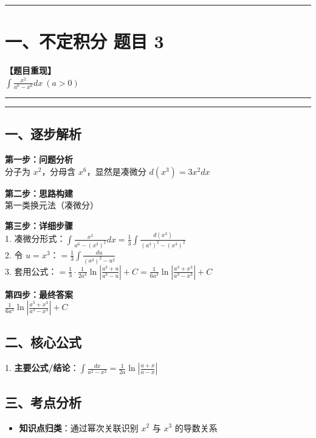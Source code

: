 ﻿\documentclass[12pt, a4paper]{ctexart}
\newcommand{\TopSeparator}{
    \par\noindent\rule{\textwidth}{1.5pt}\vspace{0.5em}
}
\newcommand{\AnalysisSeparator}{
    \par\noindent\rule{\textwidth}{0.5pt}\vspace{0.2em}\hrule\vspace{0.5em}
}
\newenvironment{RedAnalysis}{
    \par
    \color{red} 
}{
    \par
    \color{black} 
}
\begin{document}
\vspace{2em}

\TopSeparator
\section*{一、不定积分 题目 3}

\textbf{【题目重现】} \\
$\int \frac{x^2}{a^6 - x^6} dx \ (a>0)$

\AnalysisSeparator

\begin{RedAnalysis}

	\subsection*{一、逐步解析}

	\textbf{第一步：问题分析} \\
	分子为 $x^2$，分母含 $x^6$，显然是凑微分 $d(x^3) = 3x^2 dx$

	\textbf{第二步：思路构建} \\
	第一类换元法（凑微分）

	\textbf{第三步：详细步骤} \\
	1. 凑微分形式：$\int \frac{x^2}{a^6 - (x^3)^2} dx = \frac{1}{3} \int \frac{d(x^3)}{(a^3)^2 - (x^3)^2}$ \\ 
	2. 令 $u=x^3$：$= \frac{1}{3} \int \frac{du}{(a^3)^2 - u^2}$ \\ 
	3. 套用公式：$= \frac{1}{3} \cdot \frac{1}{2a^3} \ln \left| \frac{a^3+u}{a^3-u} \right| + C = \frac{1}{6a^3} \ln \left| \frac{a^3+x^3}{a^3-x^3} \right| + C$

	\textbf{第四步：最终答案} \\
	$\frac{1}{6a^3} \ln \left| \frac{a^3+x^3}{a^3-x^3} \right| + C$

	\subsection*{二、核心公式}
	1. \textbf{主要公式/结论}：$\int \frac{dx}{a^2-x^2} = \frac{1}{2a} \ln \left| \frac{a+x}{a-x} \right|$

	\subsection*{三、考点分析}
	\begin{itemize}
		\item \textbf{知识点归类}：通过幂次关联识别 $x^2$ 与 $x^3$ 的导数关系
	\end{itemize}

\end{RedAnalysis}
\end{document}
